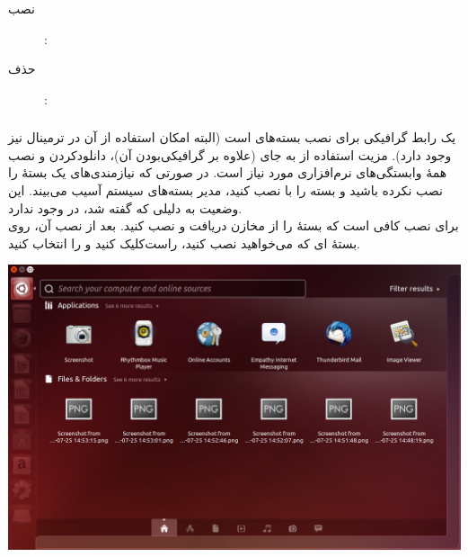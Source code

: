 \begin{description}
\item[نصب]: 
\item[حذف]: 
\end{description}

\subsubsection[gdebi]{}
 یک رابط گرافیکی برای نصب بسته‌های  است (البته امکان استفاده از آن در ترمینال نیز وجود دارد). مزیت استفاده از  به جای  (علاوه بر گرافیکی‌بودن آن)، دانلودکردن و نصب همهٔ وابستگی‌های نرم‌افزاری مورد نیاز است. در صورتی که نیازمندی‌های یک بستهٔ  را نصب نکرده باشید و بسته را با  نصب کنید، مدیر بسته‌های سیستم آسیب می‌بیند. این وضعیت به دلیلی که گفته شد، در  وجود ندارد.\\
برای نصب  کافی است که بستهٔ  را از مخازن دریافت و نصب کنید. بعد از نصب آن، روی بستهٔ  ای که می‌خواهید نصب کنید، راست‌کلیک کنید و  را انتخاب کنید.

\begin{center}
\includegraphics[scale=0.43]{pics/23.png}
\end{center}

